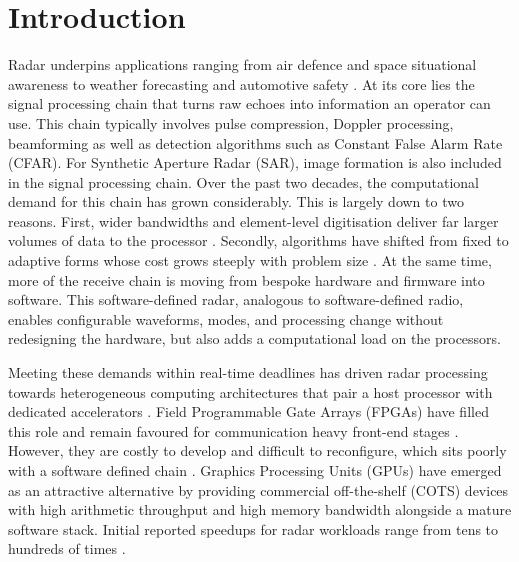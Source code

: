 \section{Introduction}
\label{sec:intro}
Radar underpins applications ranging from air defence and space situational awareness to weather forecasting and automotive safety \cite{palmerHorusFullyDigital2023, engelsAutomotiveRadarSignal2021, richardsPreviewBasicRadar2022}. At its core lies the signal processing chain that turns raw echoes into information an operator can use. This chain typically involves pulse compression, Doppler processing, beamforming as well as detection algorithms such as Constant False Alarm Rate (CFAR). For Synthetic Aperture Radar (SAR), image formation is also included in the signal processing chain. Over the past two decades, the computational demand for this chain has grown considerably. This is largely down to two reasons. First, wider bandwidths and element-level digitisation deliver far larger volumes of data to the processor \cite{fultonDigitalPhasedArrays2016, uekiDataChallengeFully2025}. Secondly, algorithms have shifted from fixed to adaptive forms whose cost grows steeply with problem size \cite{bensonGPUbasedSpacetimeAdaptive2013a, fultonDigitalPhasedArrays2016}. At the same time, more of the receive chain is moving from bespoke hardware and firmware into software. This software-defined radar, analogous to software-defined radio, enables configurable waveforms, modes, and processing change without redesigning the hardware, but also adds a computational load on the processors.

Meeting these demands within real-time deadlines has driven radar processing towards heterogeneous computing architectures that pair a host processor with dedicated accelerators \cite{mittalSurveyCPUGPUHeterogeneous2015}. Field Programmable Gate Arrays (FPGAs) have filled this role and remain favoured for communication heavy front-end stages \cite{yuImplementationRealTimePhased2016}. However, they are costly to develop and difficult to reconfigure, which sits poorly with a software defined chain \cite{perdanaSurveyGraphicsProcessing2017}. Graphics Processing Units (GPUs) have emerged as an attractive alternative by providing commercial off-the-shelf (COTS) devices with high arithmetic throughput and high memory bandwidth alongside a mature software stack. Initial reported speedups for radar workloads range from tens to hundreds of times \cite{perdanaSurveyGraphicsProcessing2017, zhaoGPUAcceleratedSignalProcessing2023, zhangAcceleratingSpaceborneSAR2016a}.

